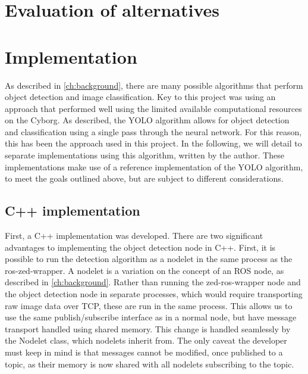 \documentclass[\rootfolder/main.tex]{subfiles}
\begin{document}

\section{Evaluation of alternatives}


\section{Implementation}

As described in \cref{ch:background}, there are many possible algorithms that perform object detection and image classification.
Key to this project was using an approach that performed well using the limited available computational resources on the Cyborg.
As described, the YOLO algorithm allows for object detection and classification using a single pass through the neural network.
For this reason, this has been the approach used in this project.
In the following, we will detail to separate implementations using this algorithm, written by the author.
These implementations make use of a reference implementation of the YOLO algorithm, to meet the goals outlined above, but are subject to different considerations.


\subsection{C++ implementation}

First, a C++ implementation was developed.
There are two significant advantages to implementing the object detection node in C++.
First, it is possible to run the detection algorithm as a nodelet in the same process as the ros-zed-wrapper.
A nodelet is a variation on the concept of an ROS node, as described in \cref{ch:background}.
Rather than running the zed-ros-wrapper node and the object detection node in separate processes, which would require transporting raw image data over TCP, these are run in the same process.
This allows us to use the same publish/subscribe interface as in a normal node, but have message transport handled using shared memory.
This change is handled seamlessly by the Nodelet class, which nodelets inherit from.
The only caveat the developer must keep in mind is that messages cannot be modified, once published to a topic, as their memory is now shared with all nodelets subscribing to the topic.
\end{document}
